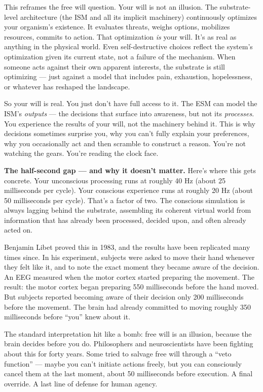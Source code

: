 \documentclass[11pt, twoside, openright]{book}
\begin{document}
This reframes the free will question. Your will is not an illusion. The substrate-level architecture (the ISM and all its implicit machinery) continuously optimizes your organism's existence. It evaluates threats, weighs options, mobilizes resources, commits to action. That optimization \textit{is} your will. It's as real as anything in the physical world. Even self-destructive choices reflect the system's optimization given its current state, not a failure of the mechanism. When someone acts against their own apparent interests, the substrate is still optimizing --- just against a model that includes pain, exhaustion, hopelessness, or whatever has reshaped the landscape.

So your will is real. You just don't have full access to it. The ESM can model the ISM's \textit{outputs} --- the decisions that surface into awareness, but not its \textit{processes}. You experience the results of your will, not the machinery behind it. This is why decisions sometimes surprise you, why you can't fully explain your preferences, why you occasionally act and then scramble to construct a reason. You're not watching the gears. You're reading the clock face.

\textbf{The half-second gap --- and why it doesn't matter.} Here's where this gets concrete. Your unconscious processing runs at roughly 40 Hz (about 25 milliseconds per cycle). Your conscious experience runs at roughly 20 Hz (about 50 milliseconds per cycle). That's a factor of two. The conscious simulation is always lagging behind the substrate, assembling its coherent virtual world from information that has already been processed, decided upon, and often already acted on.

Benjamin Libet proved this in 1983, and the results have been replicated many times since. In his experiment, subjects were asked to move their hand whenever they felt like it, and to note the exact moment they became aware of the decision. An EEG measured when the motor cortex started preparing the movement. The result: the motor cortex began preparing 550 milliseconds before the hand moved. But subjects reported becoming aware of their decision only 200 milliseconds before the movement. The brain had already committed to moving roughly 350 milliseconds before ``you'' knew about it.

The standard interpretation hit like a bomb: free will is an illusion, because the brain decides before you do. Philosophers and neuroscientists have been fighting about this for forty years. Some tried to salvage free will through a ``veto function'' --- maybe you can't initiate actions freely, but you can consciously cancel them at the last moment, about 50 milliseconds before execution. A final override. A last line of defense for human agency.
\end{document}
